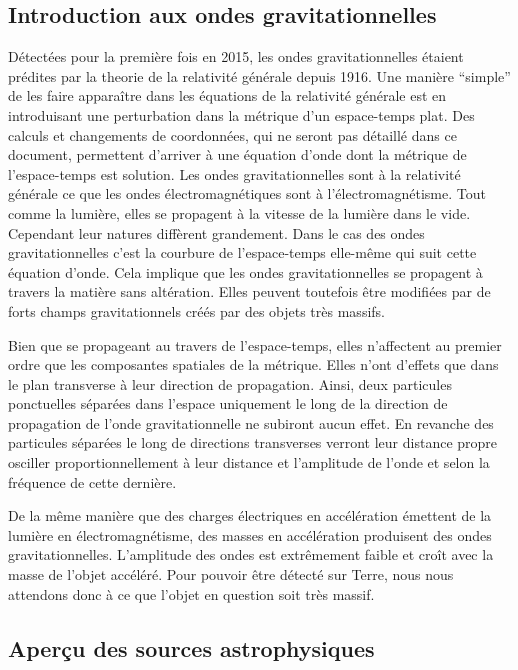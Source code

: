 
\subsection{Introduction aux ondes gravitationnelles}
\label{sec:introgw}

Détectées pour la première fois en 2015, les ondes gravitationnelles étaient prédites par la theorie de la relativité générale depuis 1916.
Une manière ``simple'' de les faire apparaître dans les équations de la relativité générale est en introduisant une perturbation dans la métrique d'un espace-temps plat.
Des calculs et changements de coordonnées, qui ne seront pas détaillé dans ce document, permettent d'arriver à une équation d'onde dont la métrique de l'espace-temps est solution.
Les ondes gravitationnelles sont à la relativité générale ce que les ondes électromagnétiques sont à l'électromagnétisme.
Tout comme la lumière, elles se propagent à la vitesse de la lumière dans le vide.
Cependant leur natures diffèrent grandement.
Dans le cas des ondes gravitationnelles c'est la courbure de l'espace-temps elle-même qui suit cette équation d'onde.
Cela implique que les ondes gravitationnelles se propagent à travers la matière sans altération.
Elles peuvent toutefois être modifiées par de forts champs gravitationnels créés par des objets très massifs.

Bien que se propageant au travers de l'espace-temps, elles n'affectent au premier ordre que les composantes spatiales de la métrique.
Elles n'ont d'effets que dans le plan transverse à leur direction de propagation.
Ainsi, deux particules ponctuelles séparées dans l'espace uniquement le long de la direction de propagation de l'onde gravitationnelle ne subiront aucun effet.
En revanche des particules séparées le long de directions transverses verront leur distance propre osciller proportionnellement à leur distance et l'amplitude de l'onde et selon la fréquence de cette dernière.

De la même manière que des charges électriques en accélération émettent de la lumière en électromagnétisme, des masses en accélération produisent des ondes gravitationnelles.
L'amplitude des ondes est extrêmement faible et croît avec la masse de l'objet accéléré.
Pour pouvoir être détecté sur Terre, nous nous attendons donc à ce que l'objet en question soit très massif.


\subsection{Aperçu des sources astrophysiques}
\label{sec:sources}

